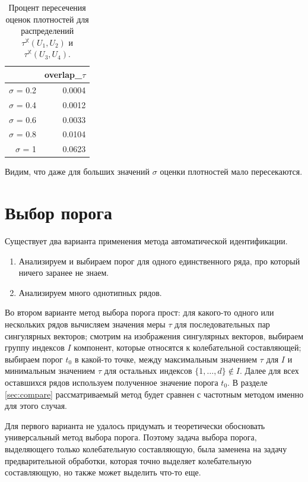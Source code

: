 \documentclass[specialist,
               substylefile = spbu.rtx,
               subf,href,colorlinks=true, 12pt]{disser}
\begin{document}
\begin{table}[hhh!]
\caption{Процент пересечения оценок плотностей для распределений $\tau^{\mathbb{X}}(U_1, U_2)$ и $\tau^{\mathbb{X}}(U_3, U_4)$.}
\centering
\begin{tabular}{rr}
  \hline
 & overlap\_$\tau$ \\
  \hline
$\sigma$ = 0.2 & 0.0004 \\ 
  $\sigma$ = 0.4 & 0.0012 \\ 
  $\sigma$ = 0.6 & 0.0033 \\ 
  $\sigma$ = 0.8 & 0.0104 \\ 
  $\sigma$ = 1 & 0.0623 \\ 
   \hline
\end{tabular}
\label{tab:model_dist_tau1_overlap_sig_noise_notint}
\end{table}

Видим, что даже для больших значений $\sigma$ оценки плотностей мало пересекаются.

\section{Выбор порога}
\label{sec:treshold_selection}

Существует два варианта применения метода автоматической идентификации.

\begin{enumerate}
\item Анализируем и выбираем порог для одного единственного ряда, про который ничего заранее не знаем.
\item Анализируем много однотипных рядов.
\end{enumerate}

Во втором варианте метод выбора порога прост:
для какого-то одного или нескольких рядов вычисляем значения меры $\tau$ для последовательных пар сингулярных векторов;
смотрим на изображения сингулярных векторов, выбираем группу индексов $I$ компонент, которые относятся к колебательной составляющей; выбираем порог $t_0$ в какой-то точке, между максимальным значением $\tau$ для $I$ и минимальным значением $\tau$ для остальных индексов $\{1,\ldots,d\} \not \in I$. Далее для всех оставшихся рядов используем полученное значение порога $t_0$. В разделе \ref{sec:compare} рассматриваемый метод будет сравнен с частотным методом именно для этого случая. 

Для первого варианта не удалось придумать и теоретически обосновать универсальный метод выбора порога. Поэтому задача выбора порога, выделяющего только колебательную составляющую, была заменена на задачу предварительной обработки, которая точно выделяет колебательную составляющую, но также может выделить что-то еще.
\end{document}
